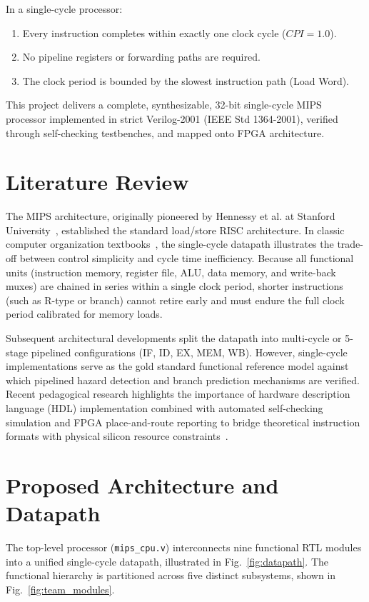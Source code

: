 \documentclass[conference]{IEEEtran}
\begin{document}
In a single-cycle processor:
\begin{enumerate}
    \item Every instruction completes within exactly one clock cycle ($CPI = 1.0$).
    \item No pipeline registers or forwarding paths are required.
    \item The clock period is bounded by the slowest instruction path (Load Word).
\end{enumerate}

This project delivers a complete, synthesizable, 32-bit single-cycle MIPS processor implemented in strict Verilog-2001 (IEEE Std 1364-2001), verified through self-checking testbenches, and mapped onto FPGA architecture.

\section{Literature Review}
The MIPS architecture, originally pioneered by Hennessy et al. at Stanford University~\cite{hennessy2017}, established the standard load/store RISC architecture. In classic computer organization textbooks~\cite{patterson2014}, the single-cycle datapath illustrates the trade-off between control simplicity and cycle time inefficiency. Because all functional units (instruction memory, register file, ALU, data memory, and write-back muxes) are chained in series within a single clock period, shorter instructions (such as R-type or branch) cannot retire early and must endure the full clock period calibrated for memory loads.

Subsequent architectural developments split the datapath into multi-cycle or 5-stage pipelined configurations (IF, ID, EX, MEM, WB). However, single-cycle implementations serve as the gold standard functional reference model against which pipelined hazard detection and branch prediction mechanisms are verified. Recent pedagogical research highlights the importance of hardware description language (HDL) implementation combined with automated self-checking simulation and FPGA place-and-route reporting to bridge theoretical instruction formats with physical silicon resource constraints~\cite{ieee2001, xilinx2016}.

\section{Proposed Architecture and Datapath}
The top-level processor (\texttt{mips\_cpu.v}) interconnects nine functional RTL modules into a unified single-cycle datapath, illustrated in Fig.~\ref{fig:datapath}. The functional hierarchy is partitioned across five distinct subsystems, shown in Fig.~\ref{fig:team_modules}.
\end{document}

